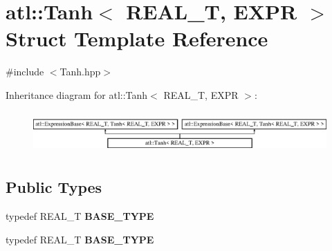 \hypertarget{structatl_1_1_tanh}{\section{atl\+:\+:Tanh$<$ R\+E\+A\+L\+\_\+\+T, E\+X\+P\+R $>$ Struct Template Reference}
\label{structatl_1_1_tanh}
}


{\ttfamily \#include $<$Tanh.\+hpp$>$}

Inheritance diagram for atl\+:\+:Tanh$<$ R\+E\+A\+L\+\_\+\+T, E\+X\+P\+R $>$\+:\begin{figure}[H]
\begin{center}
\leavevmode
\includegraphics[height=1.609195cm]{structatl_1_1_tanh}
\end{center}
\end{figure}
\subsection*{Public Types}
\begin{DoxyCompactItemize}
\item 
\hypertarget{structatl_1_1_tanh_a02517badd82285f866990f93806f9812}{typedef R\+E\+A\+L\+\_\+\+T {\bfseries B\+A\+S\+E\+\_\+\+T\+Y\+P\+E}}\label{structatl_1_1_tanh_a02517badd82285f866990f93806f9812}

\item 
\hypertarget{structatl_1_1_tanh_a02517badd82285f866990f93806f9812}{typedef R\+E\+A\+L\+\_\+\+T {\bfseries B\+A\+S\+E\+\_\+\+T\+Y\+P\+E}}\label{structatl_1_1_tanh_a02517badd82285f866990f93806f9812}

\end{DoxyCompactItemize}
